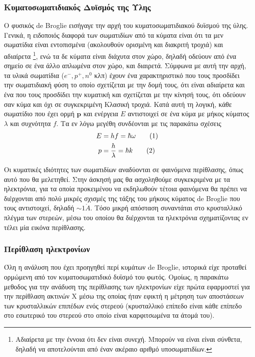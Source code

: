 \documentclass[a4paper]{article}
\newcommand\numberthis{\addtocounter{equation}{1}\tag{\theequation}}
\begin{document}
\subsubsection*{Κυματοσωματιδιακός Δυϊσμός της Υλης}
Ο φυσικός de Broglie εισήγαγε την αρχή του κυματοσωματιδιακού δυϊσμού της ύλης. Γενικά, η ειδοποιός διαφορά των σωματιδίων από τα κύματα είναι ότι τα μεν σωματίδια είναι εντοπισμένα (ακολουθούν ορισμένη και διακριτή τροχιά) και αδιαίρετα \footnote{Αδιαίρετα με την έννοια ότι δεν είναι συνεχή. Μπορούν να είναι είναι σύνθετα, δηλαδή να αποτελούνται από έναν ακέραιο αριθμό υποσωματιδίων.}, ενώ τα δε κύματα είναι διάχυτα στον χώρο, δηλαδή οδεύουν από ένα σημείο σε ένα άλλο απλωμένα στον χώρο, και διαιρετά. Σύμφωνα με αυτή την αρχή, τα υλικά σωματίδια ($e^-,p^+,n^0$ κλπ) έχουν ένα χαρακτηριστικό που τους προσδίδει την σωματιδιακή φύση το οποίο  σχετίζεται με την δομή τους, ότι είναι αδιαίρετα και ένα που τους προσδίδει την κυματική και σχετίζεται με την κίνησή τους, ότι οδεύουν σαν κύμα και όχι σε συγκεκριμένη Κλασική τροχιά. Κατά αυτή τη λογική, κάθε σωματίδιο που έχει ορμή $\textbf{p}$ και ενέργεια $Ε$ αντιστοιχεί σε ένα κύμα με μήκος κύματος $\lambda$ και συχνότητα $f$. Τα εν λόγω μεγέθη συνδέονται με τις παρακάτω σχέσεις 
\begin{align*}\label{1,2}
E&=hf=\hbar \omega \numberthis\\
p&=\frac{h}{\lambda}=\hbar k \numberthis
\end{align*}

Οι κυματικές ιδιότητες των σωματιδίων αναδύονται σε φαινόμενα περίθλασης, όπως αυτό που θα μελετηθεί. Στην άσκησή μας θα ασχοληθούμε συγκεκριμένα με τα ηλεκτρόνια, για τα οποία προκειμένου να εκδηλωθούν τέτοια φαινόμενα θα πρέπει να διέρχονται από πολύ μικρές σχισμές της τάξης του μήκους κύματος de Broglie που τους αντιστοιχεί, δηλαδή $\sim1 \mathring{A}$. Τόσο μικρή απόσταση συναντάται στο κρυσταλλικό πλέγμα των στερεών, μέσω του οποίου θα διέρχονται τα ηλεκτρόνια σχηματίζοντας εν τέλει μία εικόνα περίθλασης.

\subsubsection*{Περίθλαση ηλεκτρονίων}
Όλη η ανάλυση που έχει προηγηθεί περί κυμάτων de Broglie, ιστορικά είχε προταθεί ορμώμενη από τον κυματοσωματιδικό δυϊσμό του φωτός. Ομοίως, η παρακάτω μεθοδος για την ανάδυση της περίθλασης των ηλεκτρονίων είχε πρώτα εφαρμοστεί για την περίθλαση ακτινών Χ μέσω της οποίας ήταν εφικτή η μέτρηση των αποστάσεων των κρυσταλλικών επιπέδων ενός στερεού (κρυσταλλικό επίπεδο είναι κάθε επίπεδο στο εσωτερικό του στερεού στο οποίο είναι καρφιτσωμένα τα άτομά του).
\end{document}
